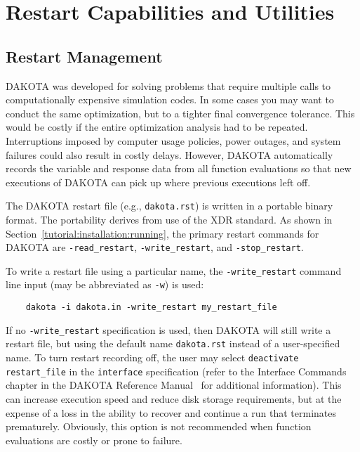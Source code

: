 \chapter{Restart Capabilities and Utilities}\label{restart}

\section{Restart Management}\label{restart:management}

DAKOTA was developed for solving problems that require multiple calls
to computationally expensive simulation codes. In some cases you may
want to conduct the same optimization, but to a tighter final
convergence tolerance. This would be costly if the entire optimization
analysis had to be repeated. Interruptions imposed by computer usage
policies, power outages, and system failures could also result in
costly delays. However, DAKOTA automatically records the variable and
response data from all function evaluations so that new executions of
DAKOTA can pick up where previous executions left off.

The DAKOTA restart file (e.g., \texttt{dakota.rst}) is written in a
portable binary format. The portability derives from use of the XDR
standard.  As shown in Section~\ref{tutorial:installation:running}, 
the primary restart commands for DAKOTA are \texttt{-read\_restart}, 
\texttt{-write\_restart}, and \texttt{-stop\_restart}.

To write a restart file using a particular name, the
\texttt{-write\_restart} command line input (may be abbreviated as
\texttt{-w}) is used:
\begin{small}
\begin{verbatim}
    dakota -i dakota.in -write_restart my_restart_file
\end{verbatim}
\end{small}
If no \texttt{-write\_restart} specification is used, then DAKOTA will
still write a restart file, but using the default name
\texttt{dakota.rst} instead of a user-specified name.  To turn restart
recording off, the user may select \texttt{deactivate restart\_file}
in the \texttt{interface} specification (refer to the Interface
Commands chapter in the DAKOTA Reference Manual~\cite{RefMan} for
additional information).  This can increase execution speed and reduce
disk storage requirements, but at the expense of a loss in the ability
to recover and continue a run that terminates prematurely.  Obviously,
this option is not recommended when function evaluations are costly or
prone to failure.

